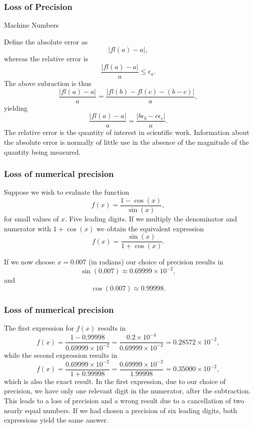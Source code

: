 \documentclass[compress]{beamer}
\begin{document}
\frame
{
  \frametitle{Loss of Precision}
  \begin{block}{Machine Numbers}
\begin{small}
{\scriptsize
Define
the absolute error as
\begin{equation}
   |fl(a)-a|,
\end{equation}
whereas the relative error is
\begin{equation}
   \frac{ |fl(a)-a|}{a} \le \epsilon_a.
\end{equation}
The above subraction is thus
\begin{equation}
   \frac{ |fl(a)-a|}{a}=\frac{ |fl(b)-fl(c)-(b-c)|}{a},
\end{equation}
yielding
\begin{equation}
   \frac{ |fl(a)-a|}{a}=\frac{ |b\epsilon_b- c\epsilon_c|}{a}.
\end{equation}
The relative error
is the quantity of interest in scientific work. Information about the
absolute error is normally of little use in the absence of the magnitude
of the quantity being measured.
}
\end{small}
  \end{block}
}

\frame
{
  \frametitle{Loss of numerical precision}
\begin{small}
{\scriptsize
Suppose we wish to evaluate the function
\[
   f(x)=\frac{1-\cos(x)}{\sin(x)},
\]
for small values of $x$. Five leading digits. If we multiply the denominator and numerator
with $1+\cos(x)$ we obtain the equivalent expression
\[
   f(x)=\frac{\sin(x)}{1+\cos(x)}.
\]

If we now choose $x=0.007$ (in radians) our choice of precision results in
\[
   \sin(0.007)\approx 0.69999\times 10^{-2},
\]
and
\[
   \cos(0.007)\approx 0.99998.
\]

}
\end{small}
}


\frame
{
  \frametitle{Loss of numerical precision}
\begin{small}
{\scriptsize
The first expression for $f(x)$ results in
\[
   f(x)=\frac{1-0.99998}{0.69999\times 10^{-2}}=\frac{0.2\times 10^{-4}}{0.69999\times 10^{-2}}=0.28572\times 10^{-2},
\]
while the second expression results in
\[
   f(x)=\frac{0.69999\times 10^{-2}}{1+0.99998}=
\frac{0.69999\times 10^{-2}}{1.99998}=0.35000\times 10^{-2},
\]
which is also the exact result. In the first expression, due to our
choice of precision, we have
only one relevant digit in the numerator, after the
subtraction. This leads to a loss of precision and a wrong result due to
a cancellation of two nearly equal numbers.
If we had chosen a precision of six leading digits, both expressions
yield the same answer.
}
\end{small}
}
\end{document}
